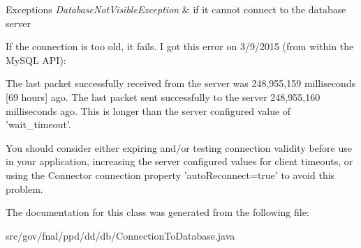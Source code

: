 \begin{DoxyExceptions}{Exceptions}
{\em Database\-Not\-Visible\-Exception} & if it cannot connect to the database server \\
\hline
\end{DoxyExceptions}
If the connection is too old, it fails. I got this error on 3/9/2015 (from within the My\-S\-Q\-L A\-P\-I)\-:


\begin{DoxyPre}
The last packet successfully received from the server was 248,955,159 milliseconds [69 hours] ago. 
The last packet sent successfully to the server 248,955,160 milliseconds ago. 
This is longer than the server configured value of 'wait\_timeout'.\end{DoxyPre}



\begin{DoxyPre}You should consider either expiring and/or testing connection validity before use in your application,
increasing the server configured values for client timeouts, or using the Connector connection property
'autoReconnect=true' to avoid this problem.
\end{DoxyPre}


The documentation for this class was generated from the following file\-:\begin{DoxyCompactItemize}
\item 
src/gov/fnal/ppd/dd/db/Connection\-To\-Database.\-java\end{DoxyCompactItemize}
